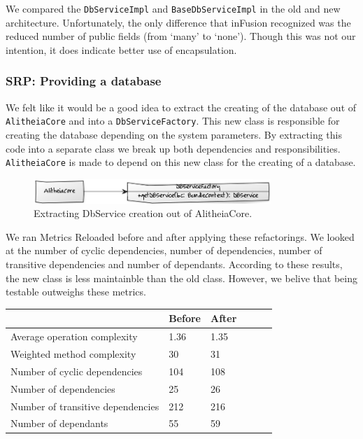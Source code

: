 \documentclass{article}
\begin{document}
We compared the \verb|DbServiceImpl| and \verb|BaseDbServiceImpl| in the old and new architecture. Unfortunately, the only difference that inFusion recognized was the reduced number of public fields (from `many' to `none'). Though this was not our intention, it does indicate better use of encapsulation.

\subsubsection{SRP: Providing a database}
We felt like it would be a good idea to extract the creating of the database out of \verb|AlitheiaCore| and into a \verb|DbServiceFactory|. This new class is responsible for creating the database depending on the system parameters. By extracting this code into a separate class we break up both dependencies and responsibilities. \verb|AlitheiaCore| is made to depend on this new class for the creating of a database.

\begin{figure}[h]
    \centering
    \includegraphics[width=0.8\textwidth]{dbfactory}
    \caption{Extracting DbService creation out of AlitheiaCore.}
    \label{fig:dbfactory}
\end{figure}

We ran Metrics Reloaded before and after applying these refactorings. We looked at the number of cyclic dependencies, number of dependencies, number of transitive dependencies and number of dependants. According to these results, the new class is less maintainble than the old class. However, we belive that being testable outweighs these metrics.

\begin{table}
    \begin{tabular}{l|llll}
    ~                                 & Before & After & ~ & ~ \\ \hline
    Average operation complexity      & 1.36   & 1.35 \\
    Weighted method complexity        & 30     & 31 \\
    Number of cyclic dependencies     & 104 & 108 \\
    Number of dependencies            & 25  & 26  \\
    Number of transitive dependencies & 212 & 216 \\
    Number of dependants              & 55  & 59  \\
    \end{tabular}
\end{table}
\end{document}
